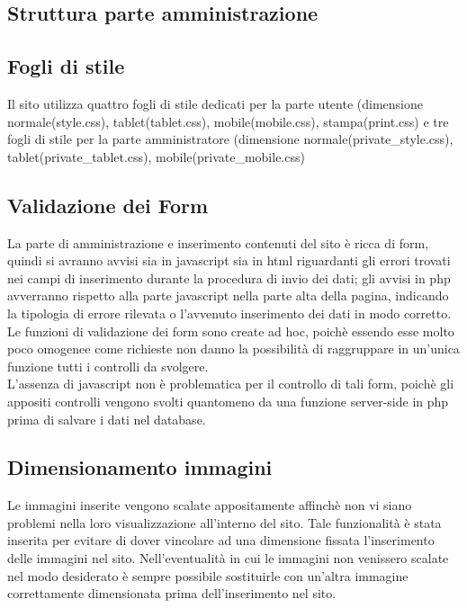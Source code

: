 \documentclass[a4paper,12pt]{article}
\begin{document}
\subsection{Struttura parte amministrazione}
\subsection{Fogli di stile}
Il sito utilizza quattro fogli di stile dedicati per la parte utente (dimensione normale(style.css), tablet(tablet.css), mobile(mobile.css), stampa(print.css) e tre fogli di stile per la parte amministratore (dimensione normale(private\_style.css), tablet(private\_tablet.css), mobile(private\_mobile.css)
\subsection{Validazione dei Form}
La parte di amministrazione e inserimento contenuti del sito è ricca di form, quindi si avranno avvisi sia in javascript sia in html riguardanti gli errori trovati nei campi di inserimento durante la procedura di invio dei dati; gli avvisi in php avverranno rispetto alla parte javascript nella parte alta della pagina, indicando la tipologia di errore rilevata o l'avvenuto inserimento dei dati in modo corretto.\\
Le funzioni di validazione dei form sono create ad hoc, poichè essendo esse molto poco omogenee come richieste non danno la possibilità di raggruppare in un'unica funzione tutti i controlli da svolgere.\\
L'assenza di javascript non è problematica per il controllo di tali form, poichè gli appositi controlli vengono svolti quantomeno da una funzione server-side in php prima di salvare i dati nel database.\\
\subsection{Dimensionamento immagini}
Le immagini inserite vengono scalate appositamente affinchè non vi siano problemi nella loro visualizzazione all'interno del sito. Tale funzionalità è stata inserita per evitare di dover vincolare ad una dimensione fissata l'inserimento delle immagini nel sito. Nell'eventualità in cui le immagini non venissero scalate nel modo desiderato è sempre possibile sostituirle con un'altra immagine correttamente dimensionata prima dell'inserimento nel sito.
\end{document}
